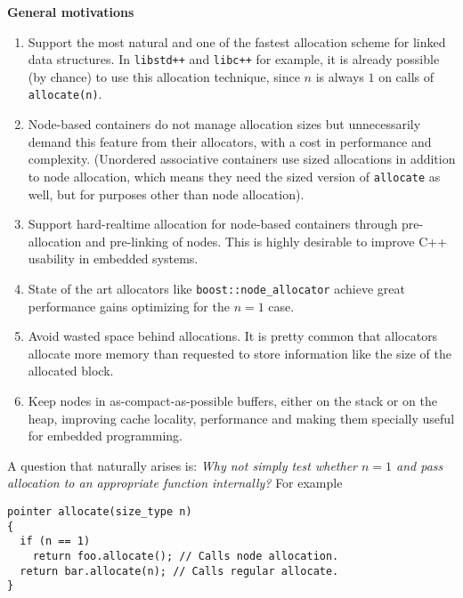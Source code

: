 \documentclass[11pt]{article}
\begin{document}
\medskip
\noindent
{\bf General motivations} \\
\begin{enumerate}

\item Support the most natural and one of the fastest allocation
scheme for linked data structures. In \texttt{libstd++} and
\texttt{libc++} for example, it is already possible (by chance) to use
this allocation technique, since $n$ is always $1$ on calls of
\texttt{allocate(n)}.

\item Node-based containers do not manage allocation sizes but
unnecessarily demand this feature from their allocators, with a cost
in performance and complexity. (Unordered associative containers use
sized allocations in addition to node allocation, which means they
need the sized version of \texttt{allocate} as well, but for purposes
other than node allocation).

\item Support hard-realtime allocation for node-based containers
through pre-allocation and pre-linking of nodes. This is highly
desirable to improve C++ usability in embedded systems.

\item State of the art allocators like \texttt{boost::node\_allocator}
\cite{boost} achieve great performance gains optimizing for the $n = 1$ case. 

\item Avoid wasted space behind allocations. It is pretty common that
allocators allocate more memory than requested to store information
like the size of the allocated block.

\item Keep nodes in as-compact-as-possible buffers, either on the
stack or on the heap, improving cache locality, performance and making
them specially useful for embedded programming.

\end{enumerate}

A question that naturally arises is: {\it Why not simply test
whether $n = 1$ and pass allocation to an appropriate
function internally?} For example

\medskip
\begin{lstlisting}
pointer allocate(size_type n)
{
  if (n == 1)
    return foo.allocate(); // Calls node allocation.
  return bar.allocate(n); // Calls regular allocate.
}
\end{lstlisting}
\end{document}
